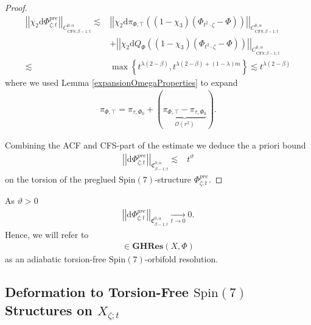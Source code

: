 \documentclass[psamsfonts]{amsart}
\theoremstyle{plain}
\theoremstyle{definition}{
\newtheorem{defi}{Definition}[section]
\newtheorem{ass}{Assumption}
\newtheorem*{nota}{Notation}}
\theoremstyle{remark}{
\newtheorem{rem}{Remark}
\newtheorem{ex}{Example}}
\theoremstyle{plain}{
\newtheorem{thm}{Theorem}[section]
\newtheorem{lem}{Lemma}[section]
\newtheorem{cor}{Corollary}[section]
\newtheorem{prop}{Proposition}[section]
\newtheorem{con}{Conjecture}[section]}
\newcommand{\m}[1]{{\mathrm{#1}}}
\newcommand{\cat}[1]{\textbf{#1}}
\begin{document}
\begin{proof}
\begin{align*}
    \left|\left|\chi_2\m{d}\Phi^{pre}_{\zeta;t}\right|\right|_{C^{0,\alpha}_{\m{CFS};\beta-1;t}}   \lesssim&\left|\left|\chi_2\m{d}\pi_{\Phi,\top}\left((1-\chi_3)(\Phi_{t^2\cdot\zeta}-\Phi)\right)\right|\right|_{C^{0,\alpha}_{\m{CFS};\beta-1;t}}\\
    &+\left|\left|\chi_2\m{d}Q_{\Phi}\left((1-\chi_3)(\Phi_{t^2\cdot\zeta}-\Phi)\right)\right|\right|_{C^{0,\alpha}_{\m{CFS};\beta-1;t}}\\
    \lesssim&\max\left\{t^{\lambda(2-\beta)},t^{\lambda(2-\beta)+(1-\lambda)m}\right\}\lesssim t^{\lambda(2-\beta)}
\end{align*}
where we used Lemma \ref{expansionOmegaProperties} to expand 
\begin{align*} 
    \pi_{\Phi,\top}=\pi_{\tau,\Phi_0}+\left(\underbrace{\pi_{\Phi,\top}-\pi_{\tau,\Phi_0}}_{\mathcal{O}(r^2)}\right).
\end{align*}


Combining the ACF and CFS-part of the estimate we deduce the a priori bound 
\begin{align*}
    \left|\left|\m{d}\Phi^{pre}_{\zeta;t}\right|\right|_{\mathfrak{C}^{0,\alpha}_{\beta-1;t}}\lesssim&t^{\vartheta}
\end{align*}
on the torsion of the preglued $\m{Spin}(7)$-structure $\Phi^{pre}_{\zeta;t}$.
\end{proof}

\begin{rem}

As $\vartheta>0$ 
\begin{align*}
    \left|\left|\m{d}\Phi^{pre}_{\zeta;t}\right|\right|_{\mathfrak{C}^{0,\alpha}_{\beta-1;t}}\xrightarrow[t\to0]{}0.
\end{align*}
Hence, we will refer to 
\begin{align*}
    [\rho_{\zeta;t}\colon(X_{\zeta;t},\Phi^{pre}_{\zeta;t})\dashrightarrow (X,\Phi)]\in \cat{GHRes}(X,\Phi)
\end{align*}
as an adiabatic torsion-free $\m{Spin}(7)$-orbifold resolution.
\end{rem}



\subsection{Deformation to Torsion-Free $\m{Spin}(7)$ Structures on $X_{\zeta;t}$}
\label{Deformation to torsion-free Spin(7) Structures on widetildeXzeta;t}
\end{document}
